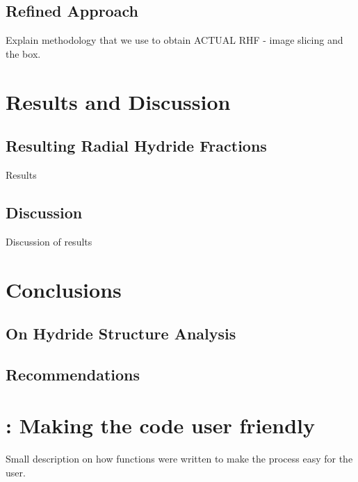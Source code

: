 \documentclass{article}
\begin{document}
\subsection{Refined Approach}
Explain methodology that we use to obtain ACTUAL RHF - image slicing and the box.

\section{Results and Discussion}
\subsection{Resulting Radial Hydride Fractions}
Results

\subsection{Discussion}
Discussion of results

\section{Conclusions}
\subsection{On Hydride Structure Analysis}

\subsection{Recommendations}

\newpage



\newpage
\appendix
\section{: Making the code user friendly}
Small description on how functions were written to make the process easy for the user.
\end{document}
